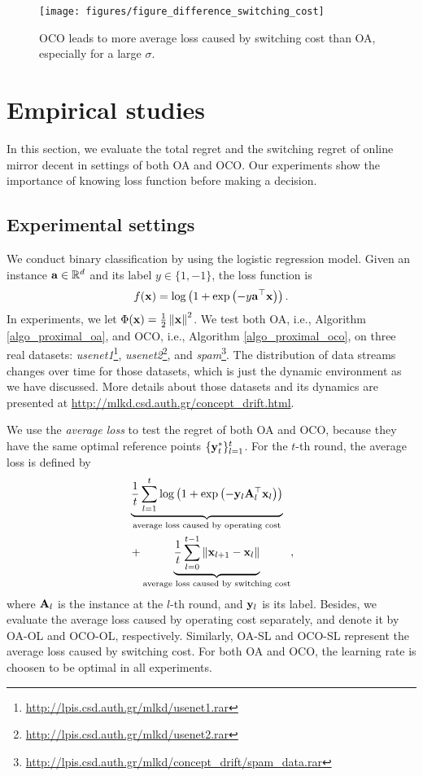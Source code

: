 \documentclass[journal]{IEEEtran}
\begin{document}
\begin{figure}[!]
\setlength{\abovecaptionskip}{0pt}
\setlength{\belowcaptionskip}{0pt}
\centering 
\texttt{[image: figures/figure\_difference\_switching\_cost]}
\caption{ OCO leads to more average loss caused by switching cost than OA, especially for a large $\sigma$. }
\label{figure_ave_loss_difference_switching_cost}
\end{figure}



\section{Empirical studies}
\label{sect_empirical_study}
In this section, we evaluate the total regret and the switching regret of online mirror decent in settings of both OA and OCO. Our experiments show the importance of knowing loss function before making a decision. 

\subsection{Experimental settings}
We conduct binary classification by using the logistic regression model. Given an instance ${\bf a}\in\mathbb{R}^d$ and its label $y\in\{1,-1\}$, the loss function is
\begin{align}
\nonumber
f({\bf x}) = \log\left( 1+\exp\left( -y{\bf a}^{\top}{\bf x} \right) \right).
\end{align} In experiments, we let $\Phi({\bf x}) = \frac{1}{2}\left\lVert{\bf x}\right\rVert^2$. We test both OA, i.e., Algorithm \ref{algo_proximal_oa}, and OCO, i.e., Algorithm \ref{algo_proximal_oco}, on three real datasets: \textit{usenet1}\footnote{\url{http://lpis.csd.auth.gr/mlkd/usenet1.rar}}, \textit{usenet2}\footnote{\url{http://lpis.csd.auth.gr/mlkd/usenet2.rar}}, and \textit{spam}\footnote{\url{http://lpis.csd.auth.gr/mlkd/concept_drift/spam_data.rar}}. The distribution of data streams changes over time for those datasets, which is just the dynamic environment as we have discussed. More details about those datasets  and its dynamics are presented at \url{http://mlkd.csd.auth.gr/concept_drift.html}.

We use the \textit{average loss} to test the regret of both OA and OCO, because they have the same optimal reference points $\{{\bf y}_t^\ast\}_{l=1}^t$. For the $t$-th round, the average loss is defined by 
\begin{align}
\nonumber
& \underbrace{\frac{1}{t}\sum_{l=1}^t \log\left( 1+\exp\left( -{\bf y}_l{\bf A}_l^{\top}{\bf x}_l \right) \right) }_{\text{average loss caused by operating cost}}\\ \nonumber 
& + \underbrace{\frac{1}{t}\sum_{l=0}^{t-1}\left\lVert{\bf x}_{l+1} - {\bf x}_l\right\rVert}_{\text{average loss caused by switching cost}},
\end{align} where ${\bf A}_l$ is the instance at the $l$-th round, and ${\bf y}_l$ is its label. Besides, we evaluate the average loss caused by operating cost separately, and denote it by OA-OL and OCO-OL, respectively. Similarly, OA-SL and OCO-SL represent the average loss caused by switching cost. For both OA and OCO, the learning rate is choosen to be optimal in all experiments. 
 
\end{document}
